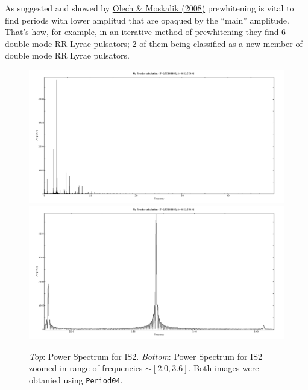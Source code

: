 \begin{enumerate} [a)]
As suggested and showed by \href{https://www.aanda.org/articles/aa/pdf/2009/05/aa11441-08.pdf}{Olech \& Moskalik (2008)} prewhitening is vital to find periods with lower amplitud that are opaqued by the ``main'' amplitude. That's how, for example, in an iterative method of prewhitening they find 6 double mode RR Lyrae pulsators; 2 of them being classified as a new member of double mode RR Lyrae pulsators. 

\begin{figure}[tb]
\centering
\includegraphics[scale=0.2]{Power_Spectrum_s2_0.jpg}
\includegraphics[scale=0.2]{Power_Spectrum_s2.jpg}
\caption{\textit{Top}: Power Spectrum for IS2.
\textit{Bottom}: Power Spectrum for IS2 zoomed in range of frequencies $\sim [2.0, 3.6]$. Both images were obtanied using \texttt{Period04}.}
\label{fig:F1}
\end{figure}
\end{enumerate}


